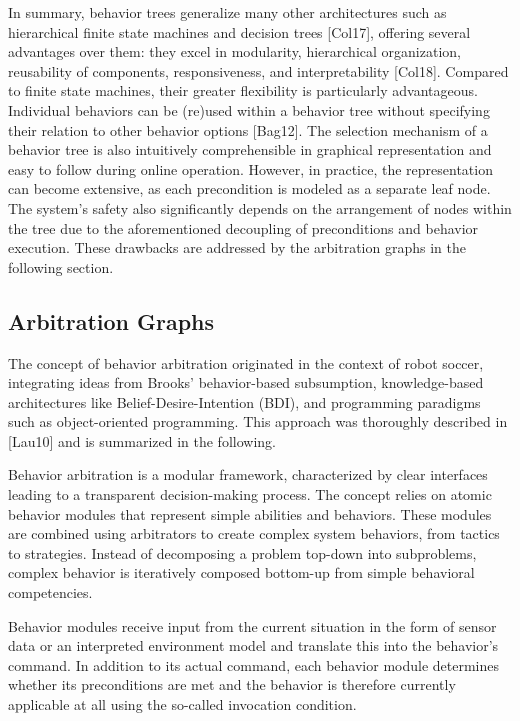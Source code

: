 In summary, behavior trees generalize many other architectures such as hierarchical finite state machines and decision trees [Col17], offering several advantages over them: they excel in modularity, hierarchical organization, reusability of components, responsiveness, and interpretability [Col18].
Compared to finite state machines, their greater flexibility is particularly advantageous.
Individual behaviors can be (re)used within a behavior tree without specifying their relation to other behavior options [Bag12].
The selection mechanism of a behavior tree is also intuitively comprehensible in graphical representation and easy to follow during online operation.
However, in practice, the representation can become extensive, as each precondition is modeled as a separate leaf node.
The system's safety also significantly depends on the arrangement of nodes within the tree due to the aforementioned decoupling of preconditions and behavior execution.
These drawbacks are addressed by the arbitration graphs in the following section.

\subsection*{Arbitration Graphs}

The concept of behavior arbitration originated in the context of robot soccer, integrating ideas from Brooks' behavior-based subsumption, knowledge-based architectures like Belief-Desire-Intention (BDI), and programming paradigms such as object-oriented programming.
This approach was thoroughly described in [Lau10] and is summarized in the following.

Behavior arbitration is a modular framework, characterized by clear interfaces leading to a transparent decision-making process.
The concept relies on atomic behavior modules that represent simple abilities and behaviors.
These modules are combined using arbitrators to create complex system behaviors, from tactics to strategies.
Instead of decomposing a problem top-down into subproblems, complex behavior is iteratively composed bottom-up from simple behavioral competencies.

Behavior modules receive input from the current situation in the form of sensor data or an interpreted environment model and translate this into the behavior's command.
In addition to its actual command, each behavior module determines whether its preconditions are met and the behavior is therefore currently applicable at all using the so-called invocation condition.

